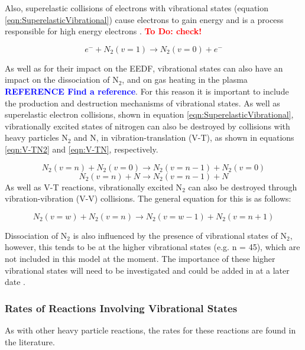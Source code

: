 \documentclass[11pt, oneside]{article}   	%
\newcommand{\todo}[1]{ \textcolor{red}{\bf{To Do:} #1}}
\newcommand{\toref}[1]{ \textcolor{blue}{\bf{REFERENCE #1}}}
\begin{document}
Also, superelastic collisions of electrons with vibrational states (equation \ref{eqn:SuperelasticVibrational}) cause electrons to gain energy and is a process responsible for high energy electrons \cite{Guerra2004kinetic}. \todo{check!}

\begin{equation}
e^- + N_2(v=1) \rightarrow N_2(v=0) + e^-
\label{eqn:SuperelasticVibrational}
\end{equation}

As well as for their impact on the EEDF, vibrational states can also have an impact on the dissociation of N$_2$, and on gas heating in the plasma \toref{Find a reference}.
For this reason it is important to include the production and destruction mechanisms of vibrational states.
As well as superelastic electron collisions, shown in equation \ref{eqn:SuperelasticVibrational}, vibrationally excited states of nitrogen can also be destroyed by collisions with heavy particles N$_2$ and N, in vibration-translation (V-T), as shown in equations \ref{eqn:V-TN2} and \ref{eqn:V-TN}, respectively.

\begin{equation}
N_2(v=n) + N_2 (v=0) \rightarrow N_2(v=n-1) + N_2(v=0)
\label{eqn:V-TN2}
\end{equation}
\begin{equation}
N_2(v=n) + N \rightarrow N_2(v=n-1) + N
\label{eqn:V-TN}
\end{equation}
As well as V-T reactions, vibrationally excited N$_2$ can also be destroyed through vibration-vibration (V-V) collisions.
The general equation for this is as follows:

\begin{equation}
N_2(v=w) + N_2 (v=n) \rightarrow N_2(v=w-1) + N_2(v=n+1)
\label{eqn:V-V}
\end{equation}

Dissociation of N$_2$ is also influenced by the presence of vibrational states of N$_2$, however, this tends to be at the higher vibrational states (e.g. n = 45), which are not included in this model at the moment. 
The importance of these higher vibrational states will need to be investigated and could be added in at a later date \cite{Guerra2004kinetic}.


\subsubsection{Rates of Reactions Involving Vibrational States}

As with other heavy particle reactions, the rates for these reactions are found in the literature.
\end{document}
